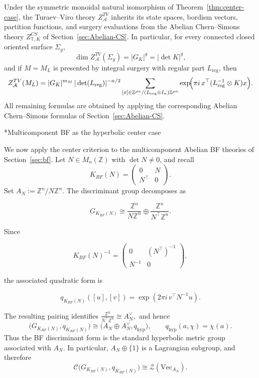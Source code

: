 \documentclass[12pt]{amsart}
\makeatletter
\renewcommand\subsection{\@startsection{subsection}{2}%
  \z@{.5\linespacing\@plus.7\linespacing}{-.5em}%
  {\normalfont\bfseries}}
\numberwithin{equation}{section}
\theoremstyle{definition}
\newcommand{\VecCat}{\mathrm{Vec}}
\makeatother
\begin{document}
Under the symmetric monoidal natural isomorphism of Theorem~\ref{thm:center-case}, the Turaev--Viro theory $Z^{TV}_{\mathcal A}$ inherits its state spaces, bordism vectors, partition functions, and surgery evaluations from the Abelian Chern--Simons theory $Z^{CS}_{\mathbb T,K}$ of Section~\ref{sec:Abelian-CS}. In particular, for every connected closed oriented surface $\Sigma_g$,
$$
\dim Z^{TV}_{\mathcal A}(\Sigma_g)=|G_K|^g=|\det K|^g,
$$
and if $M=M_L$ is presented by integral surgery with regular part $L_{\mathrm{reg}}$, then
$$
Z^{TV}_{\mathcal A}(M_L)
=
|G_K|^{m_M}\,
|\det(L_{\mathrm{reg}})|^{-n/2}
\sum_{[x]\in \mathbb Z^{\rho n}/(L_{\mathrm{reg}}\otimes I_n)\mathbb Z^{\rho n}}
\exp\!\Bigl(\pi i\,x^\top(L_{\mathrm{reg}}^{-1}\otimes K)x\Bigr).
$$
All remaining formulas are obtained by applying the corresponding Abelian Chern--Simons formulas of Section~\ref{sec:Abelian-CS}.



\subsection*{Multicomponent BF as the hyperbolic center case}

We now apply the center criterion to the multicomponent Abelian BF theories of Section~\ref{sec:bf}. Let $N\in M_n(\mathbb Z)$ with $\det N\neq0$, and recall
$$
K_{BF}(N)=
\begin{pmatrix}
0&N\\
N^\top&0
\end{pmatrix}.
$$
Set $A_N:=\mathbb Z^n/N\mathbb Z^n.$ The discriminant group decomposes as

$$
G_{K_{BF}(N)}
\cong
\frac{\mathbb Z^n}{N\mathbb Z^n}
\oplus
\frac{\mathbb Z^n}{N^\top\mathbb Z^n}.
$$

Since

$$
K_{BF}(N)^{-1}
=
\begin{pmatrix}
0&(N^\top)^{-1}\\
N^{-1}&0
\end{pmatrix},
$$

the associated quadratic form is

$$
q_{K_{BF}(N)}([u],[v])
=
\exp\!\left(2\pi i\,v^\top N^{-1}u\right).
$$

The resulting pairing identifies $\frac{\mathbb Z^n}{N^\top\mathbb Z^n}
\cong A_N^\vee,$ and hence
$$
\bigl(G_{K_{BF}(N)},q_{K_{BF}(N)}\bigr)
\cong
\bigl(A_N\oplus A_N^\vee,q_{\mathrm{hyp}}\bigr),
\qquad
q_{\mathrm{hyp}}(a,\chi)=\chi(a).$$
Thus the BF discriminant form is the standard hyperbolic metric group associated with $A_N$. In particular, $A_N\oplus\{1\}$ is a Lagrangian subgroup, and therefore
$$
\mathcal C\bigl(G_{K_{BF}(N)},q_{K_{BF}(N)}\bigr)
\cong
\mathcal Z(\VecCat_{A_N}).
$$
\end{document}

